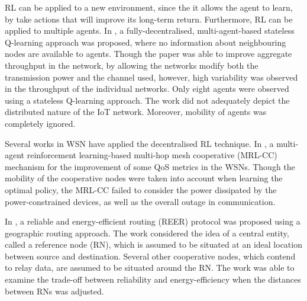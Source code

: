 \documentclass[journal]{IEEEtran}
\begin{document}
RL can be applied to a new environment, since the it allows the agent to learn, by take actions that will improve its long-term return. Furthermore, RL can be applied to multiple agents. In \cite{Wilhelmi2017}, a fully-decentralised, multi-agent-based stateless Q-learning approach was proposed, where no information about neighbouring nodes are available to agents. Though the paper was able to improve aggregate throughput in the network, by allowing the networks modify both the transmission power and the channel used, however, high variability was observed in the throughput of the individual networks. Only eight agents were observed using a stateless Q-learning approach. The work did not adequately depict the distributed nature of the IoT network. Moreover, mobility of agents was completely ignored.

Several works in WSN have applied the decentralised RL technique. In \cite{Liang2009}, a multi-agent reinforcement learning-based multi-hop mesh cooperative (MRL-CC) mechanism for the improvement of some QoS metrics in the WSNs. Though the mobility of the cooperative nodes were taken into account when learning the optimal policy, the MRL-CC failed to consider the power dissipated by the power-constrained devices, as well as the overall outage in communication.

In \cite{Chen2008}, a reliable and energy-efficient routing (REER) protocol was proposed using a geographic routing approach. The work considered the idea of a central entity, called a reference node (RN), which is assumed to be situated at an ideal location between source and destination. Several other cooperative nodes, which contend to relay data, are assumed to be situated around the RN. The work was able to examine the trade-off between reliability and energy-efficiency when the distances between RNs was adjusted.
\end{document}
